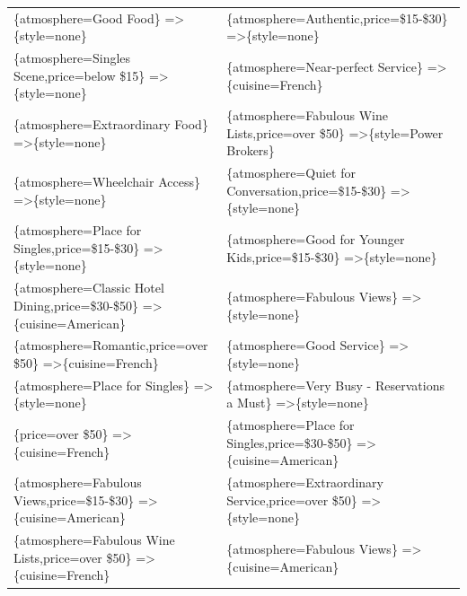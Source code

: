 \documentclass[letterpaper,10pt]{article}
\begin{document}
\begin{appendices}
\begin{table}[h]
\begin{adjustbox}{max width=\textwidth}
\begin{tabular}{ll}
\{atmosphere=Good Food\} =\textgreater \{style=none\} & \{atmosphere=Authentic,price=\$15-\$30\} =\textgreater \{style=none\} \\ 
\{atmosphere=Singles Scene,price=below \$15\} =\textgreater \{style=none\} & \{atmosphere=Near-perfect Service\} =\textgreater \{cuisine=French\} \\ 
\{atmosphere=Extraordinary Food\} =\textgreater \{style=none\} & \{atmosphere=Fabulous Wine Lists,price=over \$50\} =\textgreater \{style=Power Brokers\} \\ 
\{atmosphere=Wheelchair Access\} =\textgreater \{style=none\} & \{atmosphere=Quiet for Conversation,price=\$15-\$30\} =\textgreater \{style=none\} \\ 
\{atmosphere=Place for Singles,price=\$15-\$30\} =\textgreater \{style=none\} & \{atmosphere=Good for Younger Kids,price=\$15-\$30\} =\textgreater \{style=none\} \\ 
\{atmosphere=Classic Hotel Dining,price=\$30-\$50\} =\textgreater \{cuisine=American\} & \{atmosphere=Fabulous Views\} =\textgreater \{style=none\} \\ 
\{atmosphere=Romantic,price=over \$50\} =\textgreater \{cuisine=French\} & \{atmosphere=Good Service\} =\textgreater \{style=none\} \\ 
\{atmosphere=Place for Singles\} =\textgreater \{style=none\} & \{atmosphere=Very Busy - Reservations a Must\} =\textgreater \{style=none\} \\ 
\{price=over \$50\} =\textgreater \{cuisine=French\} & \{atmosphere=Place for Singles,price=\$30-\$50\} =\textgreater \{cuisine=American\} \\ 
\{atmosphere=Fabulous Views,price=\$15-\$30\} =\textgreater \{cuisine=American\} & \{atmosphere=Extraordinary Service,price=over \$50\} =\textgreater \{style=none\} \\ 
\{atmosphere=Fabulous Wine Lists,price=over \$50\} =\textgreater \{cuisine=French\} & \{atmosphere=Fabulous Views\} =\textgreater \{cuisine=American\} \\ 


\end{tabular}
\end{adjustbox}
\end{table}
\end{appendices}
\end{document}
